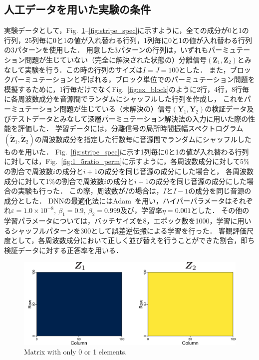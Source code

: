 \subsection{人工データを用いた実験の条件}
\label{sec:ex_condition_matrix}
実験データとして，Fig.~\ref{fig:01mat_spec}--\ref{fig:stripe_spec}に示すように，全ての成分が0と1の行列，25列毎に0と1の値が入れ替わる行列，1列毎に0と1の値が入れ替わる行列の3パターンを使用した．
用意した3パターンの行列は，いずれもパーミュテーション問題が生じていない（完全に解決された状態の）分離信号$(\bm{Z}_1, \bm{Z}_2)$とみなして実験を行う．この時の行列のサイズは$I=J=100$とした．
また，ブロックパーミュテーションと呼ばれる，ブロック単位でのパーミュテーション問題を模擬するために，1行毎だけでなくFig.~\ref{fig:ex_block}のように2行，4行，8行毎に各周波数成分を音源間でランダムにシャッフルした行列を作成し，
これをパーミュテーション問題が生じている（未解決の）信号$(\bm{Y}_1, \bm{Y}_2)$の検証データ及びテストデータとみなして深層パーミュテーション解決法の入力に用いた際の性能を評価した．
学習データには，分離信号の局所時間振幅スペクトログラム$(\check{\bm{Z}}_1, \check{\bm{Z}}_2)$の周波数成分を指定した行数毎に音源間でランダムにシャッフルしたものを用いた．
Fig.~\ref{fig:stripe_spec}に示す1列毎に0と1の値が入れ替わる行列に対しては，Fig.~\ref{fig:1_5ratio_perm}に示すように，各周波数成分に対して5\%の割合で周波数$i$の成分と$i+1$の成分を同じ音源の成分にした場合と，
各周波数成分に対して1\%の割合で周波数$i$の成分と$i+1$の成分を同じ音源の成分にした場合の実験も行った．
この際，周波数が$I$の場合は，$I$と$I-1$の成分を同じ音源の成分とした．
DNNの最適化法にはAdam~\cite{adam}を用い，ハイパーパラメータはそれぞれ$\varepsilon=1.0\times10^{-8},~\beta_1 = 0.9,~\beta_2 = 0.999$及び，学習率$\eta=0.001$とした．
その他の学習パラメータについては，バッチサイズを8，エポック数を1000，学習に用いるシャッフルパターンを300として誤差逆伝搬による学習を行った．
客観評価尺度として，各周波数成分において正しく並び替えを行うことができた割合，即ち検証データに対する正答率を用いる．


\begin{figure}[t]
  \begin{center}
      \includegraphics[width=0.95\columnwidth]{figures/origi_spec/01mat.pdf}
  \end{center}
\caption{Matrix with only 0 or 1 elements.}
\label{fig:01mat_spec}
\end{figure}


